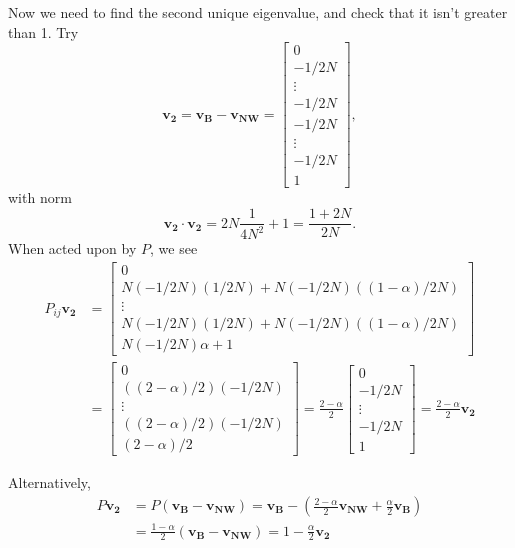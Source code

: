 \documentclass[11pt]{article}
\begin{document}
Now we need to find the second unique eigenvalue, and check that it isn't greater than 1. Try
\begin{equation}
\mathbf{v_2} = \mathbf{v_B} - \mathbf{v_{NW}} = \left[\begin{array}{c}
0 \\ -1/2N \\ \vdots \\ -1/2N \\ -1/2N \\ \vdots \\ -1/2N \\ 1
\end{array}\right],
\end{equation}
with norm
\begin{equation}
\mathbf{v_2}\cdot\mathbf{v_2} = 2N\frac{1}{4N^2} + 1 = \frac{1 + 2N}{2N}.
\end{equation}
When acted upon by $P$, we see
\begin{align}
P_{ij}\mathbf{v_2} &= \left[\begin{array}{c}
0\\
N(-1/2N)(1/2N) + N(-1/2N)((1-\alpha)/2N)\\
\vdots\\
N(-1/2N)(1/2N) + N(-1/2N)((1-\alpha)/2N) \\
N(-1/2N)\alpha + 1
\end{array}\right] \\
&=\left[\begin{array}{c}
0\\
((2-\alpha)/2)(-1/2N)\\
\vdots\\
((2-\alpha)/2)(-1/2N) \\
(2-\alpha)/2
\end{array}\right]= \frac{2-\alpha}{2}\left[\begin{array}{c}
0\\-1/2N\\\vdots\\-1/2N\\1
\end{array}\right]=\frac{2-\alpha}{2}\mathbf{v_2}
\end{align}

Alternatively,
\begin{align}
P\mathbf{v_2} &= P(\mathbf{v_B} - \mathbf{v_{NW}}) = \mathbf{v_B} - (\frac{2-\alpha}{2}\mathbf{v_{NW}} + \frac{\alpha}{2}\mathbf{v_B})\\
&=\frac{1-\alpha}{2}(\mathbf{v_B} - \mathbf{v_{NW}}) = 1-\frac{\alpha}{2}\mathbf{v_2}
\end{align}
\end{document}

